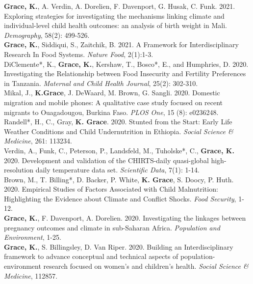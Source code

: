 \documentclass[11pt]{article} %
\begin{document}
\noindent
\textbf{Grace, K.}, A. Verdin, A. Dorelien, F. Davenport, G. Husak, C. Funk. 2021. Exploring strategies for investigating the mechanisms linking climate and individual-level child health outcomes: an analysis of birth weight in Mali. \textit{Demography}, 58(2): 499-526.\\

\noindent
\textbf{Grace, K.}, Siddiqui, S., Zaitchik, B. 2021. A Framework for Interdisciplinary Research In Food Systems. \textit{Nature Food}, 2(1):1-3.\\


\noindent
DiClemente*, K., \textbf{ Grace, K.}, Kershaw, T., Bosco*, E., and Humphries, D. 2020. Investigating the Relationship between Food Insecurity and Fertility Preferences in Tanzania. \textit{Maternal and Child Health Journal}, 25(2): 302-310.\\


\noindent
Mikal, J., \textbf{K.Grace}, J. DeWaard, M. Brown, G. Sangli. 2020. Domestic migration and mobile phones:  A qualitative case study focused on recent migrants to Ouagadougou, Burkina Faso. \textit{PLOS One}, 15 (8): e0236248.\\

\noindent
Randell*, H., C., Gray, \textbf{K. Grace}. 2020. Stunted from the Start: Early Life Weather Conditions and Child Undernutrition in Ethiopia. \textit{Social Science \& Medicine}, 261: 113234.\\

\noindent
Verdin, A., Funk, C., Peterson, P., Landsfeld, M., Tuholske*, C., \textbf{Grace, K.} 2020. Development and validation of the CHIRTS-daily quasi-global high-resolution daily temperature data set. 
\textit{Scientific Data}, 7(1): 1-14.\\

\noindent
Brown, M., T. Billing*, D. Backer, P. White, \textbf{K. Grace}, S. Doocy, P. Huth. 2020. Empirical Studies of Factors Associated with Child Malnutrition: Highlighting the Evidence about Climate and Conflict Shocks. \textit{Food Security}, 1-12.\\

\noindent
\textbf{Grace, K.}, F. Davenport, A. Dorelien. 2020.  Investigating the linkages between pregnancy outcomes and climate in sub-Saharan Africa. \textit{Population and Environment}, 1-25.\\

\noindent
\textbf{Grace, K.}, S. Billingsley, D. Van Riper.  2020. Building an Interdisciplinary framework to advance conceptual and technical aspects of population-environment research focused on women's and children's health. \textit{Social Science \& Medicine}, 112857.\\
\end{document}
